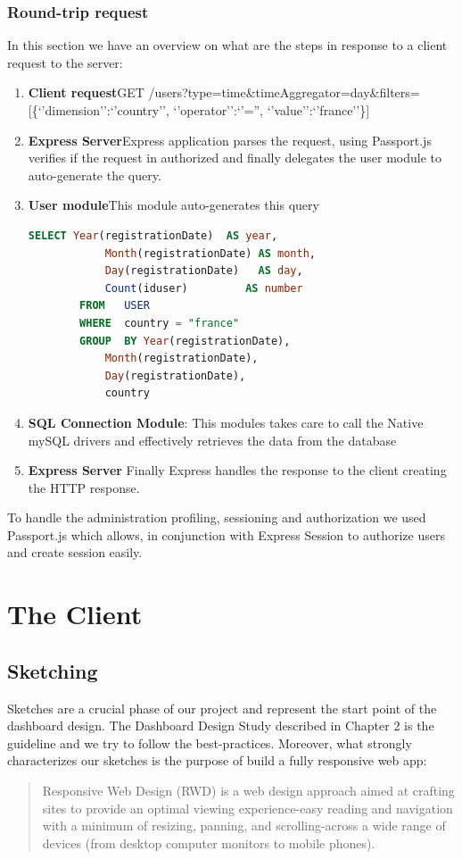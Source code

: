 \documentclass[a4paper,13pt]{report}
\begin{document}
    \subsection{Round-trip request}
    In this section we have an overview on what are the steps in response to a client request to the server:
    \begin{enumerate}
        \item \textbf{Client request}\newline GET /users?type=time\&timeAggregator=day\&filters=[\{`'dimension'':`'country'', `'operator'':`'='', `'value'':`'france''\}] 
        \item \textbf{Express Server}\newline Express application parses the request, using Passport.js verifies if the request in authorized and finally delegates the user module to auto-generate the query.
        \item \textbf{User module}\newline This module auto-generates this query 
        \begin{lstlisting}[language=SQL]
        SELECT Year(registrationDate)  AS year, 
            Month(registrationDate) AS month, 
            Day(registrationDate)   AS day, 
            Count(iduser)         AS number 
        FROM   USER 
        WHERE  country = "france" 
        GROUP  BY Year(registrationDate), 
            Month(registrationDate), 
            Day(registrationDate), 
            country 
        \end{lstlisting}
        \item \textbf{SQL Connection Module}:
            This modules takes care to call the Native mySQL drivers and effectively retrieves the data from the database
        \item  \textbf{Express Server}
            Finally Express handles the response to the client creating the HTTP response.
    \end{enumerate}


    To handle the administration profiling, sessioning and authorization we used Passport.js which allows, in conjunction with Express Session to authorize users and create session easily.
\chapter{The Client}
 \section{Sketching}
Sketches are a crucial phase of our project and represent the start point of the dashboard design. The Dashboard Design Study described in Chapter 2 is the guideline and we try to follow the best-practices.
Moreover, what strongly characterizes our sketches is the purpose of build a fully responsive web app: 
\begin{quote} 
    Responsive Web Design (RWD) is a web design approach aimed at crafting sites to provide an optimal viewing experience-easy reading and navigation with a minimum of resizing, panning, and scrolling-across a wide range of devices (from desktop computer monitors to mobile phones).
\end{quote}
\end{document}
